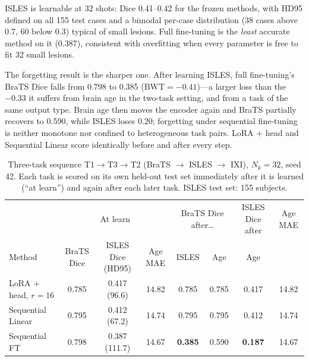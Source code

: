 \documentclass[journal,twoside,web]{ieeecolor}
\begin{document}
ISLES is learnable at 32 shots: Dice 0.41--0.42 for the frozen methods, with HD95 defined on all 155 test cases and a bimodal per-case distribution (38 cases above 0.7, 60 below 0.3) typical of small lesions. Full fine-tuning is the \emph{least} accurate method on it (0.387), consistent with overfitting when every parameter is free to fit 32 small lesions.

The forgetting result is the sharper one. After learning ISLES, full fine-tuning's BraTS Dice falls from 0.798 to 0.385 ($\text{BWT} = -0.41$)---a larger loss than the $-0.33$ it suffers from brain age in the two-task setting, and from a task of the same output type. Brain age then moves the encoder again and BraTS partially recovers to 0.590, while ISLES loses 0.20; forgetting under sequential fine-tuning is neither monotone nor confined to heterogeneous task pairs. LoRA + head and Sequential Linear score identically before and after every step.

\begin{table}[t]
\caption{Three-task sequence T1$\to$T3$\to$T2 (BraTS $\to$ ISLES $\to$ IXI), $N_k=32$, seed 42. Each task is scored on its own held-out test set immediately after it is learned (``at learn'') and again after each later task. ISLES test set: 155 subjects.}
\label{tab:three}
\centering
\footnotesize
\setlength{\tabcolsep}{4pt}
\begin{tabular}{lccc|cc|c|c}
\toprule
 & \multicolumn{3}{c|}{At learn} & \multicolumn{2}{c|}{BraTS Dice after\ldots} & ISLES Dice after & Age MAE \\
Method & BraTS Dice & ISLES Dice (HD95) & Age MAE & ISLES & Age & Age & \\
\midrule
LoRA + head, $r{=}16$ & 0.785 & 0.417 (96.6)  & 14.82 & 0.785 & 0.785 & 0.417 & 14.82 \\
Sequential Linear     & 0.795 & 0.412 (67.2)  & 14.74 & 0.795 & 0.795 & 0.412 & 14.74 \\
Sequential FT         & 0.798 & 0.387 (111.7) & 14.67 & \textbf{0.385} & 0.590 & \textbf{0.187} & 14.67 \\
\bottomrule
\end{tabular}
\end{table}

\end{document}

